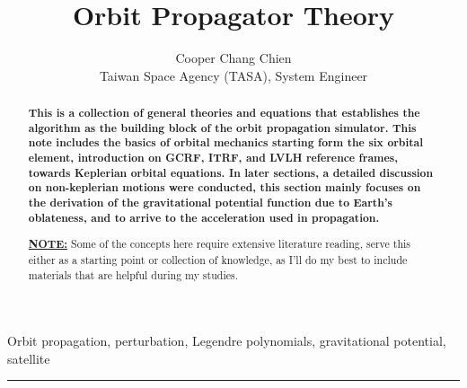 \documentclass[conference,letterpaper,onecolumn]{IEEEtran}
\title{\LARGE \bf Orbit Propagator Theory}
\author{Cooper Chang Chien\\Taiwan Space Agency (TASA), System Engineer}
\begin{document}
\maketitle
\pagestyle{headings}

\begin{abstract}
    \noindent\bfseries
    This is a collection of general theories and equations that establishes the algorithm as the building block of the orbit propagation simulator. This note includes the basics of orbital mechanics starting form the six orbital element, introduction on GCRF, ITRF, and LVLH reference frames, towards Keplerian orbital equations. In later sections, a detailed discussion on non-keplerian motions were conducted, this section mainly focuses on the derivation of the gravitational potential function due to Earth's oblateness, and to arrive to the acceleration used in propagation.\par\vspace{0.5cm}

    \noindent
    \underline{\textbf{NOTE:}} Some of the concepts here require extensive literature reading, serve this either as a starting point or collection of knowledge, as I'll do my best to include materials that are helpful during my studies. 
\end{abstract}

\begin{keywords}
    \centering\small
    Orbit propagation, perturbation, Legendre polynomials, gravitational potential, satellite
\end{keywords}
\vspace{0.2cm}
\hrule







\newpage






\newpage
\end{document}
